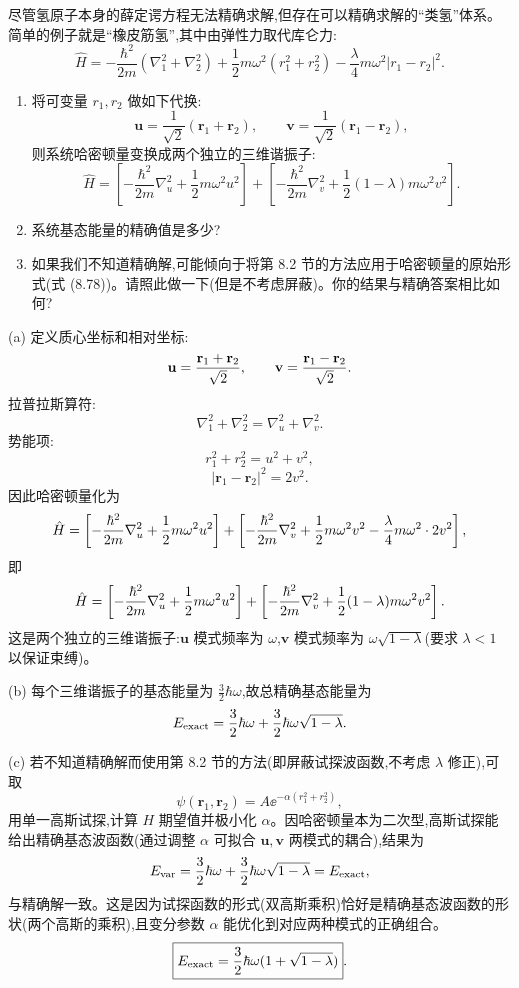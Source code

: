 \begin{question}
尽管氢原子本身的薛定谔方程无法精确求解,但存在可以精确求解的“类氢”体系。简单的例子就是“橡皮筋氢”,其中由弹性力取代库仑力:
\[
\hat H=-\frac{\hbar^2}{2m}(\nabla_1^2+\nabla_2^2)+\frac12m\omega^2(r_1^2+r_2^2)-\frac{\lambda}{4}m\omega^2|r_1-r_2|^2.
\]
\begin{enumerate}
\item 将可变量 $r_1,r_2$ 做如下代换:
\[
\mathbf u=\frac{1}{\sqrt2}(\mathbf r_1+\mathbf r_2),\qquad
\mathbf v=\frac{1}{\sqrt2}(\mathbf r_1-\mathbf r_2),
\]
则系统哈密顿量变换成两个独立的三维谐振子:
\[
\hat H=\left[-\frac{\hbar^2}{2m}\nabla_u^2+\frac12m\omega^2u^2\right]+
\left[-\frac{\hbar^2}{2m}\nabla_v^2+\frac12(1-\lambda)m\omega^2v^2\right].
\]
\item 系统基态能量的精确值是多少?
\item 如果我们不知道精确解,可能倾向于将第 8.2 节的方法应用于哈密顿量的原始形式(式 (8.78))。请照此做一下(但是不考虑屏蔽)。你的结果与精确答案相比如何?
\end{enumerate}

\par\smallskip
{}

\begin{solution}
(a) 定义质心坐标和相对坐标:
\[
\mathbf u={\mathbf r_1+\mathbf r_2\over\sqrt2},\qquad
\mathbf v={\mathbf r_1-\mathbf r_2\over\sqrt2}.
\]
拉普拉斯算符:
\[
\nabla_1^2+\nabla_2^2=\nabla_u^2+\nabla_v^2.
\]
势能项:
\[
r_1^2+r_2^2=u^2+v^2,
\]
\[
|\mathbf r_1-\mathbf r_2|^2=2v^2.
\]
因此哈密顿量化为
\[
\hat H=\left[-{\hbar^2\over2m}\nabla_u^2+{1\over2}m\omega^2u^2\right]
+\left[-{\hbar^2\over2m}\nabla_v^2+{1\over2}m\omega^2v^2-{\lambda\over4}m\omega^2\cdot2v^2\right],
\]
即
\[
\hat H=\left[-{\hbar^2\over2m}\nabla_u^2+{1\over2}m\omega^2u^2\right]
+\left[-{\hbar^2\over2m}\nabla_v^2+{1\over2}(1-\lambda)m\omega^2v^2\right].
\]
这是两个独立的三维谐振子:$\mathbf u$ 模式频率为 $\omega$,$\mathbf v$ 模式频率为 $\omega\sqrt{1-\lambda}$(要求 $\lambda<1$ 以保证束缚)。

(b) 每个三维谐振子的基态能量为 $\frac32\hbar\omega$,故总精确基态能量为
\[
E_{\rm exact}=\frac32\hbar\omega+\frac32\hbar\omega\sqrt{1-\lambda}.
\]

(c) 若不知道精确解而使用第 8.2 节的方法(即屏蔽试探波函数,不考虑 $\lambda$ 修正),可取
\[
\psi(\mathbf r_1,\mathbf r_2)=A \ee^{-\alpha(r_1^2+r_2^2)},
\]
用单一高斯试探,计算 $H$ 期望值并极小化 $\alpha$。因哈密顿量本为二次型,高斯试探能给出精确基态波函数(通过调整 $\alpha$ 可拟合 $\mathbf u,\mathbf v$ 两模式的耦合),结果为
\[
E_{\rm var}=\frac32\hbar\omega+\frac32\hbar\omega\sqrt{1-\lambda}=E_{\rm exact},
\]
与精确解一致。这是因为试探函数的形式(双高斯乘积)恰好是精确基态波函数的形状(两个高斯的乘积),且变分参数 $\alpha$ 能优化到对应两种模式的正确组合。
\[
\boxed{E_{\rm exact}=\frac32\hbar\omega(1+\sqrt{1-\lambda})}.
\]
\end{solution}
\end{question}

